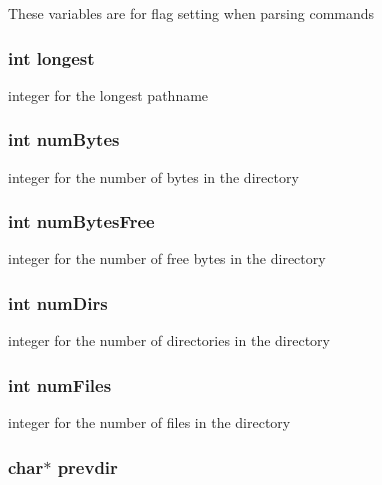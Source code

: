 These variables are for flag setting when parsing commands 
\subsubsection{\setlength{\rightskip}{0pt plus 5cm}int {\bf longest}}\label{dir_8c_8d0444808caf1022d650a2b0602968e8}


integer for the longest pathname 
\subsubsection{\setlength{\rightskip}{0pt plus 5cm}int {\bf num\-Bytes}}\label{dir_8c_d741d06221ef9f2ad307bffc9c9f4077}


integer for the number of bytes in the directory 
\subsubsection{\setlength{\rightskip}{0pt plus 5cm}int {\bf num\-Bytes\-Free}}\label{dir_8c_cd7bf78e7f342d037b25cfea5b8dca59}


integer for the number of free bytes in the directory 
\subsubsection{\setlength{\rightskip}{0pt plus 5cm}int {\bf num\-Dirs}}\label{dir_8c_88182a8b94b6142338f7d30fc24dd232}


integer for the number of directories in the directory 
\subsubsection{\setlength{\rightskip}{0pt plus 5cm}int {\bf num\-Files}}\label{dir_8c_c55fe61967bfc3ea816d6d4ed88a142c}


integer for the number of files in the directory 
\subsubsection{\setlength{\rightskip}{0pt plus 5cm}char$\ast$ {\bf prevdir}}\label{dir_8c_2426c3015451af8005d80554bed16c05}


